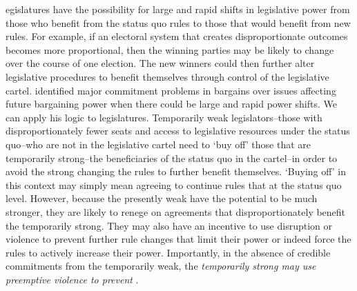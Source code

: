 \documentclass[a4paper]{article}\usepackage[]{graphicx}\usepackage[]{color}
\begin{document}
egislatures have the possibility for large and rapid shifts in legislative power from those who benefit from the status quo rules to those that would benefit from new rules. For example, if an electoral system that creates disproportionate outcomes becomes more proportional, then the winning parties may be likely to change over the course of one election. The new winners could then further alter legislative procedures to benefit themselves through control of the legislative cartel. \cite{Powell2004,Powell2006} identified major commitment problems in bargains over issues affecting future bargaining power when there could be large and rapid power shifts. We can apply his logic to legislatures. Temporarily weak legislators--those with disproportionately fewer seats and access to legislative resources under the status quo--who are not in the legislative cartel need to `buy off' those that are temporarily strong--the beneficiaries of the status quo in the cartel--in order to avoid the strong changing the rules to further benefit themselves. `Buying off' in this context may simply mean agreeing to continue rules that  at the status quo level. However, because the presently weak have the potential to be much stronger, they are likely to renege on agreements that disproportionately benefit the temporarily strong. They may also have an incentive to use disruption or violence to prevent further rule changes that limit their power or indeed force the rules to   actively increase their power. Importantly, in the absence of credible commitments from the temporarily weak, the \emph{temporarily strong may use preemptive violence to prevent }.
\end{document}
